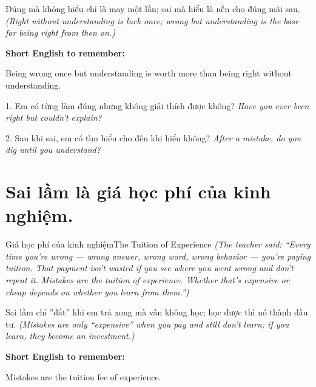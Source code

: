 \begin{baihoc}
Đúng mà không hiểu chỉ là may một lần; sai mà hiểu là nền cho đúng mãi sau.
\textit{(Right without understanding is luck once; wrong but understanding is the base for being right from then on.)}
\end{baihoc}

\begin{ghinhoanh}
\textbf{Short English to remember:}

Being wrong once but understanding is worth more than being right without understanding.

\end{ghinhoanh}

\begin{tuhocnhanh}
1. Em có từng làm đúng nhưng không giải thích được không? \textit{Have you ever been right but couldn't explain?}

2. Sau khi sai, em có tìm hiểu cho đến khi hiểu không? \textit{After a mistake, do you dig until you understand?}
\end{tuhocnhanh}
\ngancach

\section{Sai lầm là giá học phí của kinh nghiệm.}
\begin{truyen}{Giá học phí của kinh nghiệm}{The Tuition of Experience}
\textit{(The teacher said: ``Every time you're wrong — wrong answer, wrong word, wrong behavior — you're paying tuition. That payment isn't wasted if you see where you went wrong and don't repeat it. Mistakes are the tuition of experience. Whether that's expensive or cheap depends on whether you learn from them.'')}
\end{truyen}

\begin{baihoc}
Sai lầm chỉ ''đắt'' khi em trả xong mà vẫn không học; học được thì nó thành đầu tư.
\textit{(Mistakes are only ``expensive'' when you pay and still don't learn; if you learn, they become an investment.)}
\end{baihoc}

\begin{ghinhoanh}
\textbf{Short English to remember:}

Mistakes are the tuition fee of experience.

\end{ghinhoanh}

